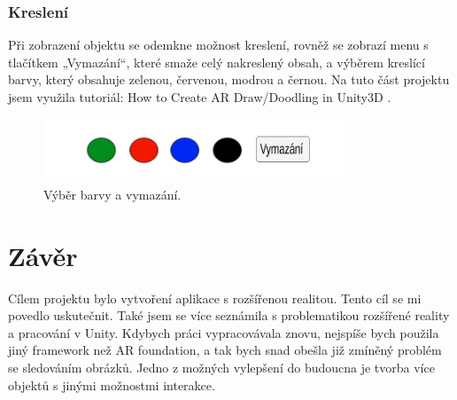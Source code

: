 \documentclass[12pt, a4paper,
twoside,        %
openright
]{report}
\begin{document}
\subsection{Kreslení}
Při zobrazení objektu se odemkne možnost kreslení, rovněž se zobrazí menu s tlačítkem „Vymazání“, které smaže celý nakreslený obsah, a výběrem kreslící barvy, který obsahuje zelenou, červenou, modrou a černou. Na tuto část projektu jsem využila tutoriál: How to Create AR Draw/Doodling in Unity3D \cite{ardrawing}.
	
	\begin{figure}[h!]
		\centering 
		\includegraphics[width=0.8\textwidth]{image/drawing.jpg} 
		\caption{Výběr barvy a vymazání.} 
		\label{fig:drawing}
	\end{figure}
	
	
	
\chapter*{Závěr}
Cílem projektu bylo vytvoření aplikace s rozšířenou realitou. Tento cíl se mi povedlo uskutečnit. Také jsem se více seznámila s problematikou rozšířené reality a pracování v Unity. Kdybych práci vypracovávala znovu, nejspíše bych použila jiný framework než AR foundation, a tak bych snad obešla již zmíněný problém se sledováním obrázků. Jedno z možných vylepšení do budoucna je tvorba více objektů s jinými možnostmi interakce.
\end{document}

